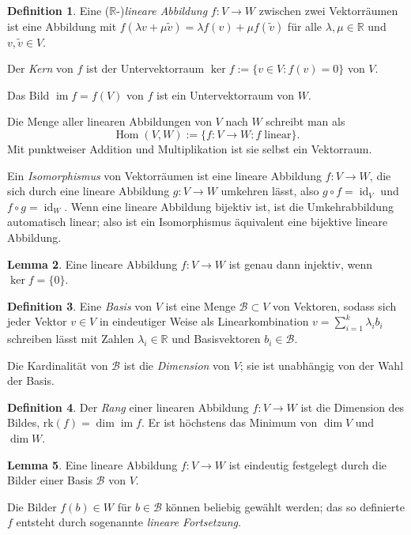 \documentclass[a4paper]{scrreprt}
\numberwithin{equation}{chapter}
\DeclareMathOperator{\id}{id}
\DeclareMathOperator{\Hom}{Hom}
\DeclareMathOperator{\im}{im}
\newcommand{\R}{\mathbb{R}}
\theoremstyle{definition}
\newtheorem{defn}{Definition}[section]
\newtheorem{lemma}[defn]{Lemma}
\begin{document}
\begin{defn}
	Eine ($\R$-)\emph{lineare Abbildung} $f\colon V\to W$ zwischen zwei Vektorräumen ist eine Abbildung mit $f(\lambda v + \mu \tilde v) = \lambda f(v) + \mu f(\tilde v)$ für alle $\lambda,\mu \in \R$ und $v,\tilde v \in V$.

	Der \emph{Kern} von $f$ ist der Untervektorraum $\ker f := \{v \in V : f(v) = 0\}$ von $V$.

	Das Bild $\im f = f(V)$ von $f$ ist ein Untervektorraum von $W$.

	Die Menge aller linearen Abbildungen von $V$ nach $W$ schreibt man als
	\[\Hom(V,W) := \{f\colon V \to W : f \; \text{linear}\}.\]
	Mit punktweiser Addition und Multiplikation ist sie selbst ein Vektorraum.
	
	Ein \emph{Isomorphismus} von Vektorräumen ist eine lineare Abbildung $f\colon V\to W$, die sich durch eine lineare Abbildung $g\colon V\to W$ umkehren lässt, also $g\circ f = \id_V$ und $f\circ g = \id_W$. Wenn eine lineare Abbildung bijektiv ist, ist die Umkehrabbildung automatisch linear; also ist ein Isomorphismus äquivalent eine bijektive lineare Abbildung.
\end{defn}

\begin{lemma}
	Eine lineare Abbildung $f\colon V \to W$ ist genau dann injektiv, wenn $\ker f = \{0\}$.
\end{lemma}

\begin{defn}
	Eine \emph{Basis} von $V$ ist eine Menge $\mathcal B \subset V$ von Vektoren, sodass sich jeder Vektor $v \in V$ in eindeutiger Weise als Linearkombination $v = \sum_{i=1}^k \lambda_i b_i$ schreiben lässt mit Zahlen $\lambda_i \in \R$ und Basisvektoren $b_i \in \mathcal B$.

	Die Kardinalität von $\mathcal B$ ist die \emph{Dimension} von $V$; sie ist unabhängig von der Wahl der Basis.
\end{defn}

\begin{defn}
	Der \emph{Rang} einer linearen Abbildung $f\colon V\to W$ ist die Dimension des Bildes, $\mathrm{rk}(f) = \dim\im f$. Er ist höchstens das Minimum von $\dim V$ und $\dim W$.
\end{defn}

\begin{lemma}
	Eine lineare Abbildung $f\colon V\to W$ ist eindeutig festgelegt durch die Bilder einer Basis $\mathcal B$ von $V$.

	Die Bilder $f(b)\in W$ für $b \in \mathcal B$ können beliebig gewählt werden; das so definierte $f$ entsteht durch sogenannte \emph{lineare Fortsetzung}.
\end{lemma}
\end{document}
